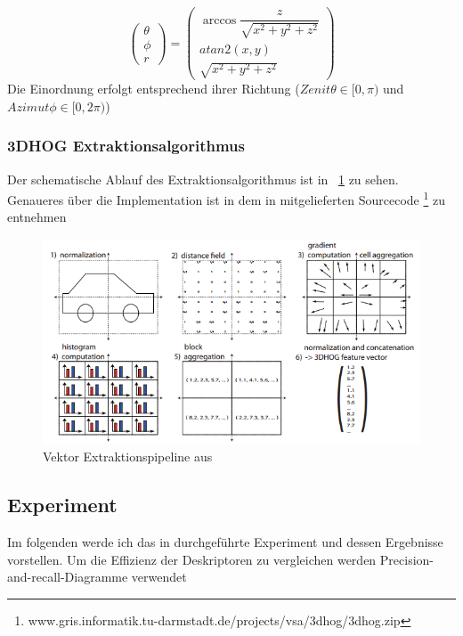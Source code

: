 \begin{equation}
\label{Sphere_Koord}
\begin{pmatrix}
	\theta \\ 
	 \phi \\ 
	 r
\end{pmatrix}
= \begin{pmatrix}
	\arccos\dfrac{z}{\sqrt{x^2+y^2+z^2}} \\ 
	 atan2(x,y) \\ 
	 \sqrt{x^2+y^2+z^2}
\end{pmatrix}
\end{equation}
Die Einordnung erfolgt entsprechend ihrer Richtung ($Zenit \theta \in [0,\pi) $ und $Azimut \phi \in [0,2\pi)$)  

\subsubsection{3DHOG Extraktionsalgorithmus }
Der schematische Ablauf des Extraktionsalgorithmus ist in \figurename~\ref{Vekt_ext_pipe} zu sehen. Genaueres über die Implementation ist in dem in \cite{scherer2010histograms} mitgelieferten Sourcecode \footnote{www.gris.informatik.tu-darmstadt.de/projects/vsa/3dhog/3dhog.zip} zu entnehmen 

 \begin{figure}[thpb]
 	\centering
 	\includegraphics[width=\linewidth]{2-Hauptteil/pics/3DHOG_extrac_pipe.png}
 	\caption{Vektor Extraktionspipeline aus \cite{scherer2010histograms}}
 	\label{Vekt_ext_pipe}
 \end{figure}
 
\subsection{Experiment}
Im folgenden werde ich das in \cite{scherer2010histograms} durchgeführte Experiment und dessen Ergebnisse vorstellen. Um die Effizienz der Deskriptoren zu vergleichen werden Precision-and-recall-Diagramme verwendet

